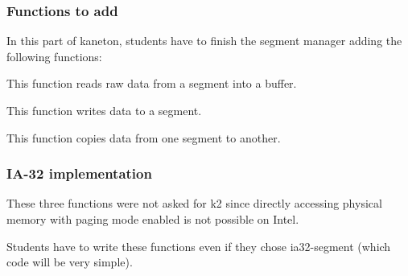 \subsubsection{Functions to add}

In this part  of kaneton, students have to  finish the segment manager
adding the following functions:


This function reads raw data from a segment into a buffer.


This function writes data to a segment.


This function copies data from one segment to another.

\subsubsection{IA-32 implementation}

These three functions  were not asked for k2  since directly accessing
physical memory with paging mode enabled is not possible on Intel.

Students have to write these functions even if they chose ia32-segment
(which code will be very simple).
